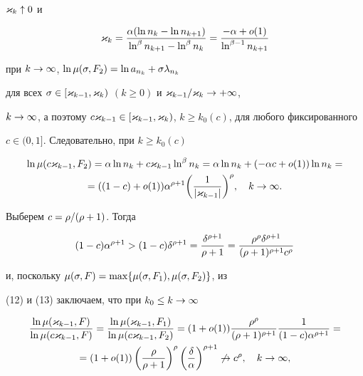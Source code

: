 \begin{pf}
$\varkappa_k\uparrow 0$ и


$$


\k_k=\dfrac{\a(\ln n_k-\ln n_{k+1})}{\ln^\be n_{k+1}-\ln^\be n_k}=


\dfrac{-\a+o(1)}{\ln^{\be-1}n_{k+1}}


$$ 


при $k\to\infty$, $\ln\mu(\sigma,F_2)=\ln a_{n_k}+\sigma\lambda_{n_k}$ 


для всех $\sigma\in[\varkappa_{k-1},\varkappa_k)$ $(k\ge 0)$ и $\varkappa_{k-1}/\varkappa_k\to+\infty$,


$k\to\i$, а поэтому $c\k_{k-1}\in


[\k_{k-1},\k_k)$, $k\ge k_0(c)$, для любого фиксированного


$c\in(0,1]$. Следовательно, при $k\ge k_0(c)$


\begin{multline}


\ln\mu(c\k_{k-1},F_2)=\a\ln n_k+c\k_{k-1}\ln^\be n_k=


\a\ln n_k+(-\a c+o(1))\ln n_k=\\


=((1- c)+o(1))\a^{\r+1} 


\biggl(\frac1{|\k_{k-1}|}\biggr)^\r,\quad k\to\i.


\end{multline}


Выберем $c=\rho/(\rho+1)$. Тогда


$$


(1-c)\a^{\r+1}>(1-c)\d^{\r+1}=\frac{\d^{\r+1}}{\r+1}=


\frac{\r^{\r}\d^{\r+1}}{(\r+1)^{\r+1}c^{\r}}        


$$ 


и, поскольку $\mu(\sigma,F)=\max\{\mu(\sigma,F_1),\mu(\sigma,F_2)\}$, из


(12) и (13) заключаем, что при $k_0\le k\to\infty$


\begin{multline*}


\frac{\ln\mu(\k_{k-1},F)}{\ln\mu(c\k_{k-1},F)}=


\frac{\ln\mu(\k_{k-1},F_1)}{\ln\mu(c\k_{k-1},F_2)}=


(1+o(1))\frac{\r^{\r}}{(\r+1)^{\r+1}}\frac{1}{(1-c)\a^{\r+1}}=\\


=(1+o(1))\left(\frac{\r}{\r+1}\right)^{\r}


\left(\frac{\d}{\a}\right)^{\r+1}\not\to c^{\r},\quad k\to\i,


\end{multline*}



\end{pf}
